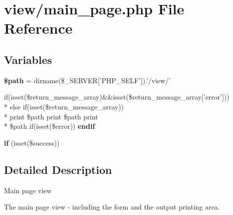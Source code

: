 \hypertarget{main__page_8php}{\section{view/main\-\_\-page.php File Reference}
\label{main__page_8php}
}
\subsection*{Variables}
\begin{DoxyCompactItemize}
\item 
\hypertarget{main__page_8php_a0a4baf0b22973c07685c3981f0d17fc4}{{\bfseries \$path} = dirname(\$\-\_\-\-S\-E\-R\-V\-E\-R\mbox{[}'P\-H\-P\-\_\-\-S\-E\-L\-F'\mbox{]}).'/view/'}\label{main__page_8php_a0a4baf0b22973c07685c3981f0d17fc4}

\item 
\hypertarget{main__page_8php_ac5267abe69bad3624bcb732c489d1f60}{if(isset(\$return\-\_\-message\-\_\-array)\&\&isset(\$return\-\_\-message\-\_\-array\mbox{[}'error'\mbox{]})) \\*
else if(isset(\$return\-\_\-message\-\_\-array)) \\*
print \$path print \$path print \\*
\$path if(isset(\$error)) {\bfseries endif}}\label{main__page_8php_ac5267abe69bad3624bcb732c489d1f60}

\item 
\hypertarget{main__page_8php_aa97e900a14ad42855f9688142e1e1552}{{\bfseries if} (isset(\$success))}\label{main__page_8php_aa97e900a14ad42855f9688142e1e1552}

\end{DoxyCompactItemize}


\subsection{Detailed Description}
Main page view

The main page view -\/ including the form and the output printing area. 